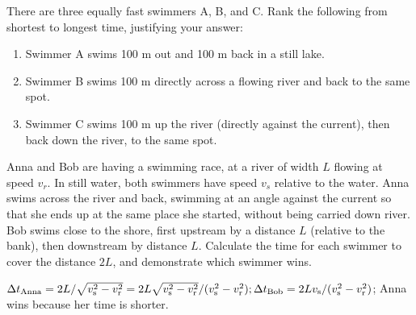\begin{Exercise}
There are three equally fast swimmers A, B, and C.  Rank the following from shortest to longest time, justifying your answer:
\begin{enumerate}[nosep,label=(\Alph*)]
\item Swimmer A swims 100 m out and 100 m back in a still lake.
\item Swimmer B swims 100 m directly across a flowing river and back to the same spot.
\item Swimmer C swims 100 m up the river (directly against the current), then back down the river, to the same spot.
\end{enumerate}
\end{Exercise}

\begin{Exercise}
Anna and Bob are having a swimming race, at a river of width $L$ flowing at speed $v_r$.  In still water, both swimmers have speed $v_s$ relative to the water.  Anna swims across the river and back, swimming at an angle against the current so that she ends up at the same place she started, without being carried down river.  Bob swims close to the shore, first upstream by a distance $L$ (relative to the bank), then downstream by distance $L$.  Calculate the time for each swimmer to cover the distance $2L$, and demonstrate which swimmer wins.  
\end{Exercise}
\begin{Answer}
$\Delta t_{\rm Anna} = 2L/\sqrt{v_{\rm s}^2-v_{\rm r}^2}=2L\sqrt{v_{\rm s}^2-v_{\rm r}^2}/(v_{\rm s}^2-v_{\rm r}^2); \Delta t_{\rm Bob} =2Lv_{\rm s}/(v_{\rm s}^2-v_{\rm r}^2 )$; Anna wins because her time is shorter.
\end{Answer}

